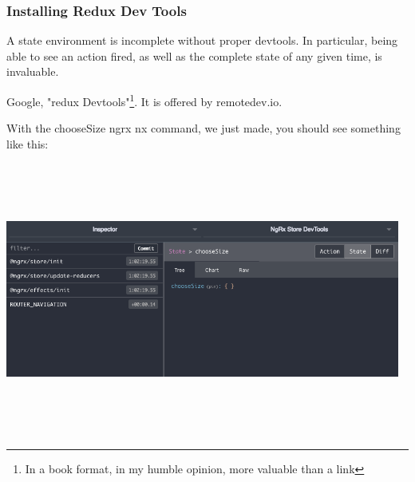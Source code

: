 \subsubsection{ Installing Redux Dev Tools }
A state environment is incomplete without proper devtools. In particular, being
able to see an action fired, as well as the complete state of any given time,
is invaluable.

Google, "redux Devtools"\footnote{In a book format, in my humble opinion, more
valuable than a link}. It is offered by remotedev.io.

With the chooseSize ngrx nx command, we just made, you should see something like
this:

\includegraphics[width=13cm, height=9cm]{state/ngrx-store/redux-store}
